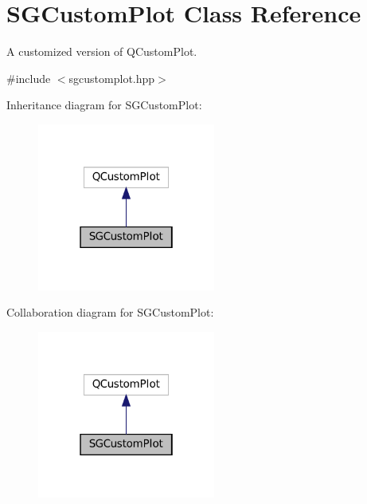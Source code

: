 \hypertarget{classSGCustomPlot}{}\section{S\+G\+Custom\+Plot Class Reference}
\label{classSGCustomPlot}


A customized version of Q\+Custom\+Plot.  




{\ttfamily \#include $<$sgcustomplot.\+hpp$>$}



Inheritance diagram for S\+G\+Custom\+Plot\+:
\nopagebreak
\begin{figure}[H]
\begin{center}
\leavevmode
\includegraphics[width=166pt]{classSGCustomPlot__inherit__graph}
\end{center}
\end{figure}


Collaboration diagram for S\+G\+Custom\+Plot\+:
\nopagebreak
\begin{figure}[H]
\begin{center}
\leavevmode
\includegraphics[width=166pt]{classSGCustomPlot__coll__graph}
\end{center}
\end{figure}
